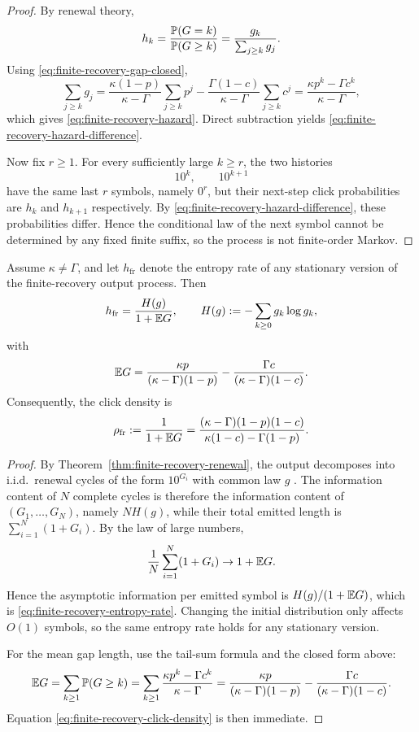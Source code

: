 \begin{proof}
By renewal theory,
\[
h_k=\frac{\mathbb{P}(G=k)}{\mathbb{P}(G\ge k)}=\frac{g_k}{\sum_{j\ge k}g_j}.
\]
Using \eqref{eq:finite-recovery-gap-closed},
\[
\sum_{j\ge k}g_j
=
\frac{\kappa(1-p)}{\kappa-\Gamma}\sum_{j\ge k}p^j
-
\frac{\Gamma(1-c)}{\kappa-\Gamma}\sum_{j\ge k}c^j
=
\frac{\kappa p^k-\Gamma c^k}{\kappa-\Gamma},
\]
which gives \eqref{eq:finite-recovery-hazard}. Direct subtraction yields \eqref{eq:finite-recovery-hazard-difference}.

Now fix $r\ge 1$. For every sufficiently large $k\ge r$, the two histories
\[
10^k,
\qquad
10^{k+1}
\]
have the same last $r$ symbols, namely $0^r$, but their next-step click probabilities are $h_k$ and $h_{k+1}$ respectively. By \eqref{eq:finite-recovery-hazard-difference}, these probabilities differ. Hence the conditional law of the next symbol cannot be determined by any fixed finite suffix, so the process is not finite-order Markov.
\end{proof}

\begin{corollary}\label{cor:finite-recovery-entropy}
Assume $\kappa\neq\Gamma$, and let $h_{\mathrm{fr}}$ denote the entropy rate of any stationary version of the finite-recovery output process. Then
\begin{equation}\label{eq:finite-recovery-entropy-rate}
h_{\mathrm{fr}}
=
\frac{H(g)}{1+\mathbb{E} G},
\qquad
H(g):=-\sum_{k\ge 0} g_k\log g_k,
\end{equation}
with
\begin{equation}\label{eq:finite-recovery-gap-mean}
\mathbb{E} G
=
\frac{\kappa p}{(\kappa-\Gamma)(1-p)}
-
\frac{\Gamma c}{(\kappa-\Gamma)(1-c)}.
\end{equation}
Consequently, the click density is
\begin{equation}\label{eq:finite-recovery-click-density}
\rho_{\mathrm{fr}}
:=
\frac{1}{1+\mathbb{E} G}
=
\frac{(\kappa-\Gamma)(1-p)(1-c)}{\kappa(1-c)-\Gamma(1-p)}.
\end{equation}
\end{corollary}

\begin{proof}
By Theorem~\ref{thm:finite-recovery-renewal}, the output decomposes into i.i.d.\ renewal cycles of the form $10^{G_i}$ with common law $g$ \cite{DaleyVereJones2008}. The information content of $N$ complete cycles is therefore the information content of $(G_1,\dots,G_N)$, namely $N H(g)$, while their total emitted length is $\sum_{i=1}^N (1+G_i)$. By the law of large numbers,
\[
\frac{1}{N}\sum_{i=1}^N (1+G_i)\to 1+\mathbb{E} G.
\]
Hence the asymptotic information per emitted symbol is $H(g)/(1+\mathbb{E} G)$, which is \eqref{eq:finite-recovery-entropy-rate}. Changing the initial distribution only affects $O(1)$ symbols, so the same entropy rate holds for any stationary version.

For the mean gap length, use the tail-sum formula and the closed form above:
\[
\mathbb{E} G
=
\sum_{k\ge 1}\mathbb{P}(G\ge k)
=
\sum_{k\ge 1}\frac{\kappa p^k-\Gamma c^k}{\kappa-\Gamma}
=
\frac{\kappa p}{(\kappa-\Gamma)(1-p)}
-
\frac{\Gamma c}{(\kappa-\Gamma)(1-c)}.
\]
Equation \eqref{eq:finite-recovery-click-density} is then immediate.
\end{proof}

